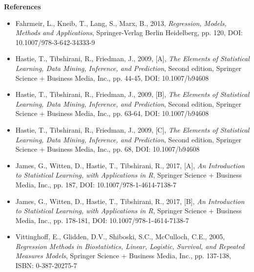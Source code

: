 \documentclass[12pt,a4paper]{article}
\begin{document}
\newpage

\begin{center}
\Large{\textbf{References}}
\end{center}

\begin{itemize}
  \item Fahrmeir, L., Kneib, T., Lang, S., Marx, B., 2013, \emph{Regression, Models, Methods and Applications}, Springer-Verlag Berlin Heidelberg, pp. 120, DOI: 10.1007/978-3-642-34333-9
  \item Hastie, T., Tibshirani, R., Friedman, J., 2009, [A], \emph{The Elements of Statistical Learning, Data Mining, Inference, and Prediction}, Second edition, Springer Science + Business Media, Inc., pp. 44-45, DOI: 10.1007/b94608
  \item Hastie, T., Tibshirani, R., Friedman, J., 2009, [B], \emph{The Elements of Statistical Learning, Data Mining, Inference, and Prediction}, Second edition, Springer Science + Business Media, Inc., pp. 63-64, DOI: 10.1007/b94608
  \item Hastie, T., Tibshirani, R., Friedman, J., 2009, [C], \emph{The Elements of Statistical Learning, Data Mining, Inference, and Prediction}, Second edition, Springer Science + Business Media, Inc., pp. 68, DOI: 10.1007/b94608
  \item James, G., Witten, D., Hastie, T., Tibshirani, R., 2017, [A], \emph{An Introduction to Statistical Learning, with Applications in R}, Springer Science + Business Media, Inc., pp. 187, DOI: 10.1007/978-1-4614-7138-7
  \item James, G., Witten, D., Hastie, T., Tibshirani, R., 2017, [B], \emph{An Introduction to Statistical Learning, with Applications in R}, Springer Science + Business Media, Inc., pp. 178-181, DOI: 10.1007/978-1-4614-7138-7
  \item Vittinghoff, E., Glidden, D.V., Shiboski, S.C., McCulloch, C.E., 2005, \emph{Regression Methods in Biostatistics, Linear, Logistic, Survival, and Repeated Measures Models}, Springer Science + Business Media, Inc., pp. 137-138, ISBN: 0-387-20275-7
\end{itemize}
\end{document}
